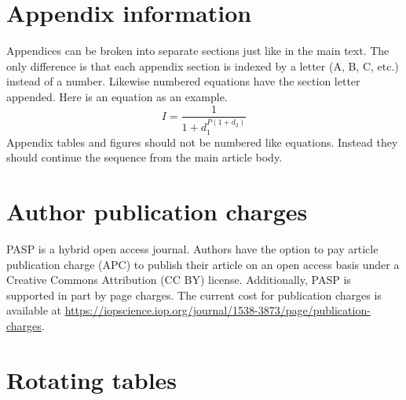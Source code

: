 \documentclass[linenumbers]{aastex631}
\begin{document}


\appendix

\section{Appendix information}

Appendices can be broken into separate sections just like in the main text.
The only difference is that each appendix section is indexed by a letter
(A, B, C, etc.) instead of a number.  Likewise numbered equations have
the section letter appended.  Here is an equation as an example.
\begin{equation}
I = \frac{1}{1 + d_{1}^{P (1 + d_{2} )}}
\end{equation}
Appendix tables and figures should not be numbered like equations. Instead
they should continue the sequence from the main article body.


\section{Author publication charges} \label{sec:pubcharge}

PASP is a hybrid open access journal. Authors have the option to pay article publication charge (APC) to publish their article on an open access basis under a Creative Commons Attribution (CC BY) license. Additionally, PASP is supported in part by page charges.  The current cost
for publication charges is available at 
\url{https://iopscience.iop.org/journal/1538-3873/page/publication-charges}. 

\section{Rotating tables} \label{sec:rotate}
\end{document}
